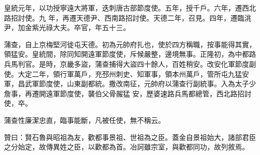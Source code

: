 \begin{pinyinscope}
 皇統元年，以功授寧遠大將軍，迭刺唐古部節度使。五年，授千戶。六年，遷西北路招討使。九
 年，再遷天德尹、西南路招討使。天德二年，召見。四年，遷臨洮尹，加金紫光祿大夫。卒官，年五十三。



 蒲查，自上京梅堅河徙屯天德。初為元帥府扎也，使於四方稱職，按事能得其實，領猛安。皇統間，除同知開遠軍節度使，斥候嚴整，邊境無事。正隆初，為中都路兵馬判官。是時，京畿多盜，蒲查捕得大盜四十餘人，百姓稍安。改安化軍節度副使。大定二年，領行軍萬戶，充邳州刺史、知軍事，領本州萬戶，管所屯九猛安軍，昌武軍節度使，山東副都統。撒改南征，元帥府以蒲查行副統事。入為太子少詹事，再遷開遠軍節度使，襲伯父骨赧猛
 安，歷婆速路兵馬都總管，西北路招討使，卒。



 蒲查性廉潔忠直，臨事能斷，凡被任使，無不稱云。



 贊曰：賢石魯與昭祖為友，歡都事景祖、世祖為之臣。蓋金自景祖始大，諸部君臣之分始定，故傳異姓之臣，以歡都為首。冶訶雖宗室，與歡都同功，故列敘焉。



\end{pinyinscope}